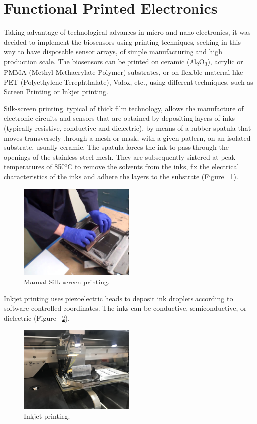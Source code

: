 \section{Functional Printed Electronics}
Taking advantage of technological advances in micro and nano electronics, it was decided to implement the biosensors using printing techniques, seeking in this way to have disposable sensor arrays, of simple manufacturing and high production scale. The biosensors can be printed on ceramic (Al\textsubscript{2}O\textsubscript{3}), acrylic or PMMA (Methyl Methacrylate Polymer) substrates, or on flexible material like PET (Polyethylene Terephthalate), Valox, etc., using different techniques, such as Screen Printing or Inkjet printing.

Silk-screen printing, typical of thick film technology, allows the manufacture of electronic circuits and sensors that are obtained by depositing layers of inks (typically resistive, conductive and dielectric), by means of a rubber spatula that moves transversely through a mesh or mask, with a given pattern, on an isolated substrate, usually ceramic. The spatula forces the ink to pass through the openings of the stainless steel mesh. They are subsequently sintered at peak temperatures of 850ºC to remove the solvents from the inks, fix the electrical characteristics of the inks and adhere the layers to the substrate (Figure ~\ref{fig:Figura_serigrafia}).

\begin{figure}[H]
  \centering
    \includegraphics[width=0.5\textwidth]{Figures/Figura_serigrafia}
  \caption{Manual Silk-screen printing.}
  \label{fig:Figura_serigrafia}
\end{figure}

Inkjet printing uses piezoelectric heads to deposit ink droplets according to software controlled coordinates. The inks can be conductive, semiconductive, or dielectric (Figure ~\ref{fig:Figura_inkjet_dimatix}).

\begin{figure}[H]
  \centering
    \includegraphics[width=0.5\textwidth]{Figures/Figura_inkjet_dimatix}
  \caption{Inkjet printing.}
  \label{fig:Figura_inkjet_dimatix}
\end{figure}

